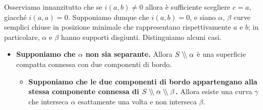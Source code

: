 Osserviamo innanzitutto che se $i(a,b)\neq 0$ allora è sufficiente scegliere $c=a$, giacché $i(a,a)=0$. Supponiamo dunque che $i(a,b)=0$, e siano $\alpha$, $\beta$ curve semplici chiuse in posizione minimale che rappresentano rispettivamente $a$ e $b$; in particolare, $\alpha$ e $\beta$ hanno supporti disgiunti. Distinguiamo alcuni casi.
\begin{itemize}
\item \textbf{Supponiamo che $\alpha$ non sia separante.} Allora $S\mathrel{\setminus\mkern-4mu\setminus} \alpha$ è una superficie compatta connessa con due componenti di bordo.
\begin{itemize}
\item \textbf{Supponiamo che le due componenti di bordo appartengano alla stessa componente connessa di $S\mathrel{\setminus\mkern-4mu\setminus}\alpha\mathrel{\setminus\mkern-4mu\setminus}\beta$.} Allora esiste una curva $\gamma$ che interseca $\alpha$ esattamente una volta e non interseca $\beta$.
\end{itemize}
\end{itemize}